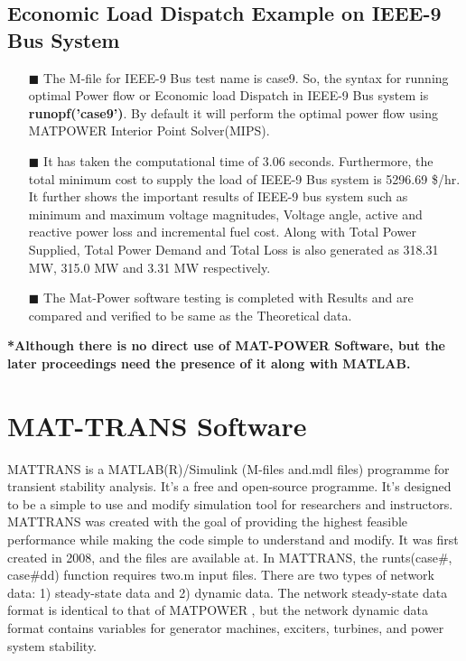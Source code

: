 \subsection{Economic Load Dispatch Example on IEEE-9 Bus System}
\begin{itemize} 
\item[\tiny{$\blacksquare$}]The M-file for IEEE-9 Bus test name is case9. So, the syntax for running optimal Power flow or Economic load Dispatch in IEEE-9 Bus system is \textbf{runopf('case9')}. By default it will perform the optimal power flow using MATPOWER Interior Point Solver(MIPS). 
\item[\tiny{$\blacksquare$}]It has taken the computational time of 3.06 seconds. Furthermore, the total minimum cost to supply the load of IEEE-9 Bus system is 5296.69 \$/hr. It further shows the important results of IEEE-9 bus system such as minimum and maximum voltage magnitudes, Voltage angle, active and reactive power loss and incremental fuel cost. Along with Total Power Supplied, Total Power Demand and Total Loss is also generated as 318.31 MW, 315.0 MW and 3.31 MW respectively.
\item[\tiny{$\blacksquare$}]The Mat-Power software testing is completed with Results and are compared and verified to be same as the Theoretical data.
\end{itemize}
\textbf{*Although there is no direct use of MAT-POWER Software, but the later proceedings need the presence of it along with MATLAB.}

\section{MAT-TRANS Software}
MATTRANS is a MATLAB(R)/Simulink (M-files and.mdl files) programme for transient stability analysis. It's a free and open-source programme. It's designed to be a simple to use and modify simulation tool for researchers and instructors. MATTRANS was created with the goal of providing the highest feasible performance while making the code simple to understand and modify. It was first created in 2008, and the files are available at\cite{MattransSoft}. In MATTRANS, the runts(case\#, case\#dd) function requires two.m input files. There are two types of network data: 1) steady-state data and 2) dynamic data. The network steady-state data format is identical to that of MATPOWER \cite{L1}, but the network dynamic data format contains variables for generator machines, exciters, turbines, and power system stability.

